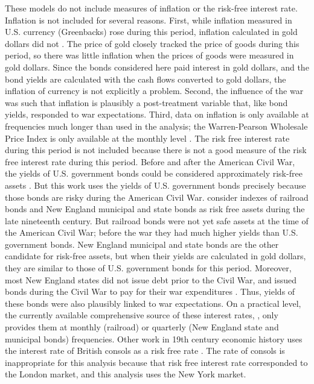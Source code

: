 These models do not include measures of inflation or the risk-free interest rate.
Inflation is not included for several reasons.
First, while inflation measured in U.S. currency (Greenbacks) rose during this period, inflation calculated in gold dollars did not \parencites{Mitchell1903}{Mitchell1908}.
The price of gold closely tracked the price of goods during this period, so there was little inflation when the prices of goods were measured in gold dollars.
Since the bonds considered here paid interest in gold dollars, and the bond yields are calculated with the cash flows converted to gold dollars, the inflation of currency is not explicitly a problem.
Second, the influence of the war was such that inflation is plausibly a post-treatment variable that, like bond yields, responded to war expectations.
Third, data on inflation is only available at frequencies much longer than used in the analysis; the Warren-Pearson Wholesale Price Index is only available at the monthly level \parencite{WarrenPearson1933a}.
The risk free interest rate during this period is not included because there is not a good measure of the risk free interest rate during this period.
Before and after the American Civil War, the yields of U.S. government bonds could be considered approximately risk-free assets \parencites{HomerSylla2005}.
But this work uses the yields of U.S. government bonds precisely because those bonds are risky during the American Civil War.
\textcites{Macaulay1938}{HomerSylla2005} consider indexes of railroad bonds and New England municipal and state bonds as risk free assets during the late nineteenth century.
But railroad bonds were not yet safe assets at the time of the American Civil War; before the war they had much higher yields than U.S. government bonds.
New England municipal and state bonds are the other candidate for risk-free assets, but when their yields are calculated in gold dollars, they are similar to those of U.S. government bonds for this period.
Moreover, most New England states did not issue debt prior to the Civil War, and issued bonds during the Civil War to pay for their war expenditures \parencite[86--87]{Martin1871}.
Thus, yields of these bonds were also plausibly linked to war expectations.
On a practical level, the currently available comprehensive source of these interest rates, \textcite{Macaulay1938}, only provides them at monthly (railroad) or quarterly (New England state and municipal bonds) frequencies.
Other work in 19th century economic history uses the interest rate of British consols as a risk free rate \parencite{BordoRockoff1996a}.
The rate of consols is inappropriate for this analysis because that risk free interest rate corresponded to the  London market, and this analysis uses the New York market.



